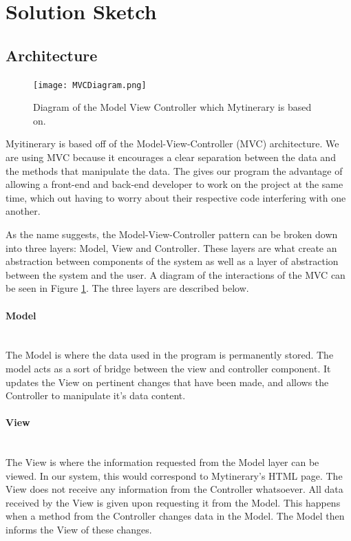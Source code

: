 \documentclass[12pt]{article}
\begin{document}
\section{Solution Sketch}

\subsection{Architecture}
%
\begin{figure}[ht!]
\centering
\texttt{[image: MVCDiagram.png]}
\caption{Diagram of the Model View Controller which Mytinerary is based on. \label{MVC}}
\end{figure}
%
Myitinerary is based off of the Model-View-Controller (MVC) architecture. We are using MVC because it encourages a clear separation between the data and the methods that manipulate the data. The gives our program the advantage of allowing a front-end and back-end developer to work on the project at the same time, which out having to worry about their respective code interfering with one another.

As the name suggests, the Model-View-Controller pattern can be broken down into three layers: Model, View and Controller. These layers are what create an abstraction between components of the system as well as a layer of abstraction between the system and the user. A diagram of the interactions of the MVC can be seen in Figure \ref{MVC}. The three layers are described below.
%
\paragraph*{Model}~\\
The Model is where the data used in the program is permanently stored. The model acts as a sort of bridge between the view and controller component. It updates the View on pertinent changes that have been made, and allows the Controller to manipulate it's data content. 
\paragraph*{View}~\\
The View is where the information requested from the Model layer can be viewed. In our system, this would correspond to Mytinerary's HTML page. The View does not receive any information from the Controller whatsoever. All data received by the View is given upon requesting it from the Model. This happens when a method from the Controller changes data in the Model. The Model then informs the View of these changes.
%
\end{document}
